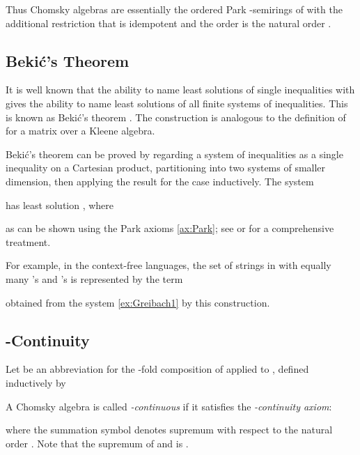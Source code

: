 \documentclass[copyright,creativecommons]{eptcs}
\theoremstyle{remark}
\newcommand{\fhcomment}[1]{\textcolor{red}{[\textbf{Comment (FH)}: {#1}]}}
\newcommand{\dkcomment}[1]{\textcolor{blue}{[\textbf{Comment (DK)}: {#1}]}}
\renewcommand{\fhcomment}[1]{}
\renewcommand{\dkcomment}[1]{}
\begin{document}
Thus Chomsky algebras are essentially the ordered Park -semirings of \cite{EsikLeiss05} with the additional restriction that  is idempotent and the order is the natural order .

\subsection{Beki\'c's Theorem}
\label{sec:Bekic}

It is well known that the ability to name least solutions of single inequalities with  gives the ability to name least solutions of all finite systems of inequalities. This is known as Beki\'c's theorem \cite{bekic1984}. The construction is analogous to the definition of  for a matrix  over a Kleene algebra. 
\fhcomment{Add: Formulate Beki\'c's Theorem: Algebraic closure for systems of inequations over , not just .}\dkcomment{I suggest not wasting space with this. It is well known and done in detail in Winskel's book and \'Esik and Leiss, and we give the references below. We also do the 2x2 example, which is more instructive than any general formulation would be.}\fhcomment{OK.}

Beki\'c's theorem can be proved by regarding a system of inequalities as a single inequality on a Cartesian product, partitioning into two systems of smaller dimension, then applying the result for the  case inductively. The  system

has least solution , where

as can be shown using the Park axioms \eqref{ax:Park}; see \cite{Winskel93} or \cite{EsikLeiss05} for a comprehensive treatment.


For example, in the context-free languages, the set of strings in  with equally many 's and 's is represented by the term

obtained from the system \eqref{ex:Greibach1} by this construction.

\subsection{-Continuity}
\label{sec:continuity}

Let  be an abbreviation for the -fold composition of  applied to , defined inductively by

A Chomsky algebra is called \emph{-continuous} if it satisfies the \emph{-continuity axiom}:

where the summation symbol denotes supremum with respect to the natural order . Note that the supremum of  and  is .
\end{document}
